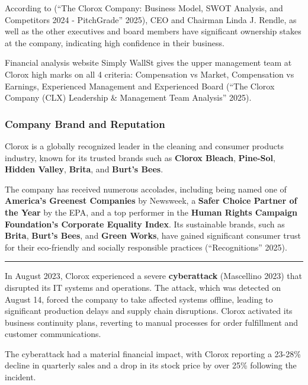 \documentclass[
  letterpaper,
  DIV=11,
  numbers=noendperiod]{scrartcl}
\begin{document}
According to ({``The {Clorox Company}: {Business Model}, {SWOT
Analysis}, and {Competitors} 2024 - {PitchGrade}''} 2025), CEO and
Chairman Linda J. Rendle, as well as the other executives and board
members have significant ownership stakes at the company, indicating
high confidence in their business.

Financial analysis website Simply WallSt gives the upper management team
at Clorox high marks on all 4 criteria: Compensation vs Market,
Compensation vs Earnings, Experienced Management and Experienced Board
({``The {Clorox Company} ({CLX}) {Leadership} \& {Management Team
Analysis}''} 2025).

\subsubsection{\texorpdfstring{\textbf{Company Brand and
Reputation}}{Company Brand and Reputation}}\label{company-brand-and-reputation}

Clorox is a globally recognized leader in the cleaning and consumer
products industry, known for its trusted brands such as \textbf{Clorox
Bleach}, \textbf{Pine-Sol}, \textbf{Hidden Valley}, \textbf{Brita}, and
\textbf{Burt's Bees}.

The company has received numerous accolades, including being named one
of \textbf{America's Greenest Companies} by Newsweek, a \textbf{Safer
Choice Partner of the Year} by the EPA, and a top performer in the
\textbf{Human Rights Campaign Foundation's Corporate Equality Index}.
Its sustainable brands, such as \textbf{Brita}, \textbf{Burt's Bees},
and \textbf{Green Works}, have gained significant consumer trust for
their eco-friendly and socially responsible practices
({``Recognitions''} 2025).

\begin{center}\rule{0.5\linewidth}{0.5pt}\end{center}

In August 2023, Clorox experienced a severe \textbf{cyberattack}
(Mascellino 2023) that disrupted its IT systems and operations. The
attack, which was detected on August 14, forced the company to take
affected systems offline, leading to significant production delays and
supply chain disruptions. Clorox activated its business continuity
plans, reverting to manual processes for order fulfillment and customer
communications.

The cyberattack had a material financial impact, with Clorox reporting a
23-28\% decline in quarterly sales and a drop in its stock price by over
25\% following the incident.
\end{document}
